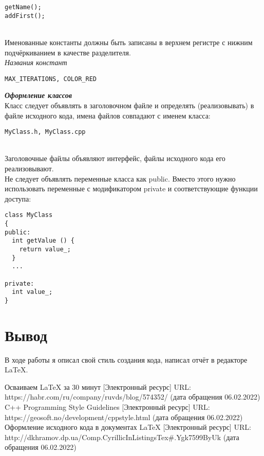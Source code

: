 \documentclass{article}
\begin{document}
\begin{lstlisting}
getName();
addFirst();
\end{lstlisting}
\\Именованные константы должны быть записаны в верхнем регистре с нижним подчёркиванием в качестве разделителя.
\textit{\\Названия констант}
\begin{lstlisting}
MAX_ITERATIONS, COLOR_RED
\end{lstlisting}
\textbf{\emph{Оформление классов}}
\\Класс следует объявлять в заголовочном файле и определять (реализовывать) в файле исходного кода, имена файлов совпадают с именем класса:
\begin{lstlisting}
MyClass.h, MyClass.cpp
\end{lstlisting}
\\Заголовочные файлы объявляют интерфейс, файлы исходного кода его реализовывают.
\\Не следует объявлять переменные класса как public. Вместо этого нужно использовать переменные с модификатором private и соответствующие функции доступа:
\begin{lstlisting}
class MyClass
{
public:
  int getValue () {
    return value_;
  }
  ...

private:
  int value_;
}
\end{lstlisting}
\section{Вывод}
В ходе работы я описал свой стиль создания кода, написал отчёт в редакторе \LaTeX{}.
\begin{thebibliography}{3}
  Осваиваем LaTeX за 30 минут [Электронный ресурс] URL: https://habr.com/ru/company/ruvds/blog/574352/ (дата обращения 06.02.2022)
  C++ Programming Style Guidelines [Электронный ресурс] URL: https://geosoft.no/development/cppstyle.html (дата обращения 06.02.2022)
  Оформление исходного кода в документах LaTeX [Электронный ресурс] URL: http://dkhramov.dp.ua/Comp.CyrillicInListingsTex#.Ygk7599ByUk (дата обращения 06.02.2022)
\end{thebibliography}
\end{document}
